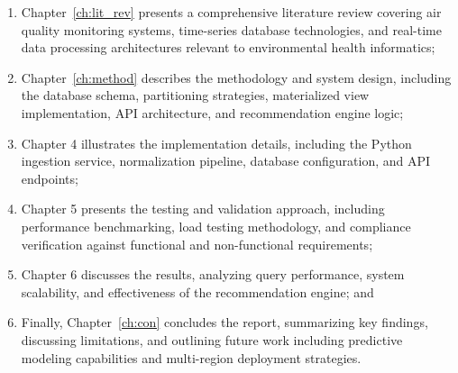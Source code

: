 \begin{enumerate}
    \item Chapter~\ref{ch:lit_rev} presents a comprehensive literature review covering air quality monitoring systems, time-series database technologies, and real-time data processing architectures relevant to environmental health informatics;
    \item Chapter~\ref{ch:method} describes the methodology and system design, including the database schema, partitioning strategies, materialized view implementation, API architecture, and recommendation engine logic;
    \item Chapter 4 illustrates the implementation details, including the Python ingestion service, normalization pipeline, database configuration, and API endpoints;
    \item Chapter 5 presents the testing and validation approach, including performance benchmarking, load testing methodology, and compliance verification against functional and non-functional requirements;
    \item Chapter 6 discusses the results, analyzing query performance, system scalability, and effectiveness of the recommendation engine;  and
    \item Finally, Chapter~\ref{ch:con} concludes the report, summarizing key findings, discussing limitations, and outlining future work including predictive modeling capabilities and multi-region deployment strategies.
\end{enumerate}

